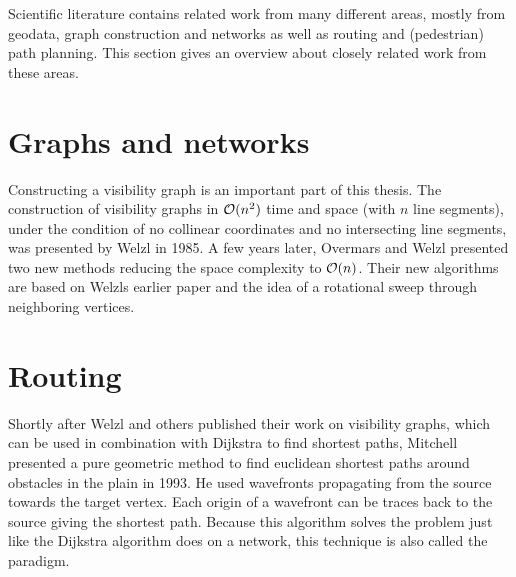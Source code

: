 
Scientific literature contains related work from many different areas, mostly from geodata, graph construction and networks as well as routing and (pedestrian) path planning.
This section gives an overview about closely related work from these areas.

\section{Graphs and networks}

	Constructing a visibility graph is an important part of this thesis.
	The construction of visibility graphs in $\mathcal{O}(n^2)$ time and space (with $n$ line segments), under the condition of no collinear coordinates and no intersecting line segments, was presented by Welzl in 1985\cite{welzl-visibility-graph}.
	A few years later, Overmars and Welzl presented two new methods reducing the space complexity to $\mathcal{O}(n)$\cite{overmars-weizl-visibility-graph}.
	Their new algorithms are based on Welzls earlier paper and the idea of a rotational sweep through neighboring vertices.
	

\section{Routing}

	Shortly after Welzl and others published their work on visibility graphs, which can be used in combination with Dijkstra to find shortest paths, Mitchell presented a pure geometric method to find euclidean shortest paths around obstacles in the plain in 1993\cite{mitchell-shortest-path}.
	He used wavefronts propagating from the source towards the target vertex.
	Each origin of a wavefront can be traces back to the source giving the shortest path.
	Because this algorithm solves the  problem just like the Dijkstra algorithm does on a network, this technique is also called the  paradigm.
	
